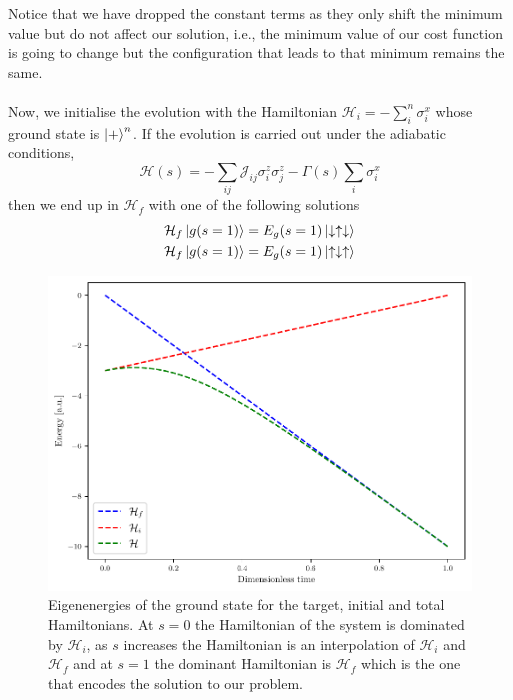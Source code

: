 Notice that we have dropped the constant terms as they only shift the minimum value but do not affect our solution, i.e., the minimum value of our cost function is going to change but the configuration that leads to that minimum remains the same.\\\\
Now, we initialise the evolution with the Hamiltonian $\mathcal{H}_{i} = -\sum_{i}^{n}\sigma_{i}^{x}$ whose ground state is $\ket{+}^{n}$. 
If the evolution is carried out under the adiabatic conditions,
\begin{equation}
    \mathcal{H}(s) = -\sum_{ij}\mathcal{J}_{ij}\sigma_{i}^{z}\sigma_{j}^{z}  - \Gamma(s)\sum_{i}\sigma_{i}^{x}
\end{equation}
then we end up in $\mathcal{H}_{f}$ with one of the following solutions
\begin{align}
    \mathcal{H}_{f}\ket{g(s=1)} = E_{g}(s=1)\ket{\downarrow\uparrow\downarrow} \\
    \mathcal{H}_{f}\ket{g(s=1)} = E_{g}(s=1)\ket{\uparrow\downarrow\uparrow}
\end{align}
\begin{figure}[H]
\centering
\includegraphics[width=\textwidth]{Figures/Two-Heirs.pdf}
    \caption{Eigenenergies of the ground state for the target, initial and total Hamiltonians. At $s=0$ the Hamiltonian of the system is dominated by $\mathcal{H}_{i}$, as $s$ increases the Hamiltonian is an interpolation of $\mathcal{H}_{i}$ and $\mathcal{H}_{f}$ and at $s=1$ the dominant Hamiltonian is $\mathcal{H}_{f}$ which is the one that encodes the solution to our problem.}
    \label{fig:HamiltonianInterpolation}
\end{figure}
